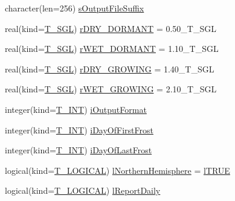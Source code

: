 \begin{DoxyCompactItemize}
\item 
character(len=256) \hyperlink{typetest_1_1_t___m_o_d_e_l___c_o_n_f_i_g_u_r_a_t_i_o_n_a2f3357a8dfe3a7814732287636a8c5af}{sOutputFileSuffix}
\item 
real(kind=\hyperlink{namespacetest_a04d8b9090502de3a00046fe904bc3d99}{T\_\-SGL}) \hyperlink{typetest_1_1_t___m_o_d_e_l___c_o_n_f_i_g_u_r_a_t_i_o_n_a98720f353b69a31ab15ab887bc9b860e}{rDRY\_\-DORMANT} = 0.50\_\-T\_\-SGL
\item 
real(kind=\hyperlink{namespacetest_a04d8b9090502de3a00046fe904bc3d99}{T\_\-SGL}) \hyperlink{typetest_1_1_t___m_o_d_e_l___c_o_n_f_i_g_u_r_a_t_i_o_n_a1ebaa1191f2dfacff696caed3a4178a8}{rWET\_\-DORMANT} = 1.10\_\-T\_\-SGL
\item 
real(kind=\hyperlink{namespacetest_a04d8b9090502de3a00046fe904bc3d99}{T\_\-SGL}) \hyperlink{typetest_1_1_t___m_o_d_e_l___c_o_n_f_i_g_u_r_a_t_i_o_n_a9ff5766b4c4b5989bb7f53529b292fbf}{rDRY\_\-GROWING} = 1.40\_\-T\_\-SGL
\item 
real(kind=\hyperlink{namespacetest_a04d8b9090502de3a00046fe904bc3d99}{T\_\-SGL}) \hyperlink{typetest_1_1_t___m_o_d_e_l___c_o_n_f_i_g_u_r_a_t_i_o_n_a6f4e954805d7d13b02946768fe22d29e}{rWET\_\-GROWING} = 2.10\_\-T\_\-SGL
\item 
integer(kind=\hyperlink{namespacetest_a6f91ebd89b58cfcc5da99faed9385c1e}{T\_\-INT}) \hyperlink{typetest_1_1_t___m_o_d_e_l___c_o_n_f_i_g_u_r_a_t_i_o_n_a41a8ef4e1ce332526406479cc7158e64}{iOutputFormat}
\item 
integer(kind=\hyperlink{namespacetest_a6f91ebd89b58cfcc5da99faed9385c1e}{T\_\-INT}) \hyperlink{typetest_1_1_t___m_o_d_e_l___c_o_n_f_i_g_u_r_a_t_i_o_n_a4991a7ccab48fa46d5afc6e378e66379}{iDayOfFirstFrost}
\item 
integer(kind=\hyperlink{namespacetest_a6f91ebd89b58cfcc5da99faed9385c1e}{T\_\-INT}) \hyperlink{typetest_1_1_t___m_o_d_e_l___c_o_n_f_i_g_u_r_a_t_i_o_n_acf4059294d64a5e1d14d9c270e60fe10}{iDayOfLastFrost}
\item 
logical(kind=\hyperlink{namespacetest_acdeac586276a7d1d394fb5eddc77fc3d}{T\_\-LOGICAL}) \hyperlink{typetest_1_1_t___m_o_d_e_l___c_o_n_f_i_g_u_r_a_t_i_o_n_abfeef509fcc540a844dfee18f9f996c6}{lNorthernHemisphere} = \hyperlink{namespacetest_ab7046de13f01778d86667e4266521664}{lTRUE}
\item 
logical(kind=\hyperlink{namespacetest_acdeac586276a7d1d394fb5eddc77fc3d}{T\_\-LOGICAL}) \hyperlink{typetest_1_1_t___m_o_d_e_l___c_o_n_f_i_g_u_r_a_t_i_o_n_a3f363fa4354689e75c9a1f1a90c1f978}{lReportDaily}
\item 

\end{DoxyCompactItemize}
